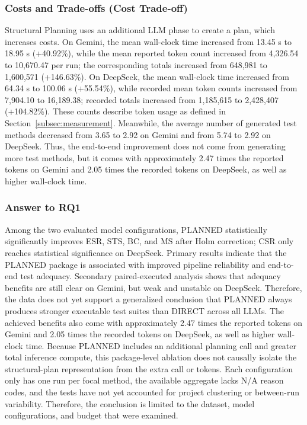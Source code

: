 \documentclass[pdflatex,sn-basic,Numbered,iicol]{sn-jnl}
\begin{document}
\subsubsection{Costs and Trade-offs (Cost Trade-off)}\label{subsubsec:rq1-cost}

Structural Planning uses an additional LLM phase to create a plan, which increases costs. On Gemini, the mean wall-clock time increased from 13.45 s to 18.95 s (+40.92\%), while the mean reported token count increased from 4,326.54 to 10,670.47 per run; the corresponding totals increased from 648,981 to 1,600,571 (+146.63\%). On DeepSeek, the mean wall-clock time increased from 64.34 s to 100.06 s (+55.54\%), while recorded mean token counts increased from 7,904.10 to 16,189.38; recorded totals increased from 1,185,615 to 2,428,407 (+104.82\%). These counts describe token usage as defined in Section~\ref{subsec:measurement}. Meanwhile, the average number of generated test methods decreased from 3.65 to 2.92 on Gemini and from 5.74 to 2.92 on DeepSeek. Thus, the end-to-end improvement does not come from generating more test methods, but it comes with approximately 2.47 times the reported tokens on Gemini and 2.05 times the recorded tokens on DeepSeek, as well as higher wall-clock time.

\subsubsection{Answer to RQ1}\label{subsubsec:rq1-answer}

Among the two evaluated model configurations, PLANNED statistically significantly improves ESR, STS, BC, and MS after Holm correction; CSR only reaches statistical significance on DeepSeek. Primary results indicate that the PLANNED package is associated with improved pipeline reliability and end-to-end test adequacy. Secondary paired-executed analysis shows that adequacy benefits are still clear on Gemini, but weak and unstable on DeepSeek. Therefore, the data does not yet support a generalized conclusion that PLANNED always produces stronger executable test suites than DIRECT across all LLMs. The achieved benefits also come with approximately 2.47 times the reported tokens on Gemini and 2.05 times the recorded tokens on DeepSeek, as well as higher wall-clock time. Because PLANNED includes an additional planning call and greater total inference compute, this package-level ablation does not causally isolate the structural-plan representation from the extra call or tokens. Each configuration only has one run per focal method, the available aggregate lacks N/A reason codes, and the tests have not yet accounted for project clustering or between-run variability. Therefore, the conclusion is limited to the dataset, model configurations, and budget that were examined.
\end{document}
